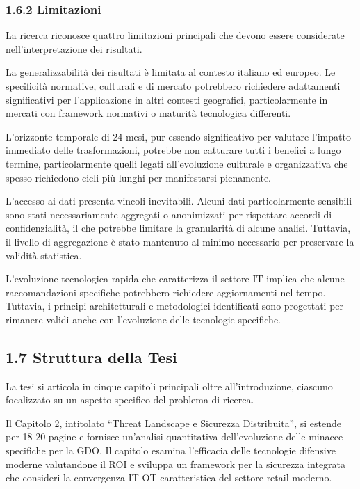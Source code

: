 \documentclass{report}
\begin{document}
\subsubsection{\texorpdfstring{\textbf{1.6.2
Limitazioni}}{1.6.2 Limitazioni}}\label{limitazioni}

La ricerca riconosce quattro limitazioni principali che devono essere
considerate nell'interpretazione dei risultati.

La generalizzabilità dei risultati è limitata al contesto italiano ed
europeo. Le specificità normative, culturali e di mercato potrebbero
richiedere adattamenti significativi per l'applicazione in altri
contesti geografici, particolarmente in mercati con framework normativi
o maturità tecnologica differenti.

L'orizzonte temporale di 24 mesi, pur essendo significativo per valutare
l'impatto immediato delle trasformazioni, potrebbe non catturare tutti i
benefici a lungo termine, particolarmente quelli legati all'evoluzione
culturale e organizzativa che spesso richiedono cicli più lunghi per
manifestarsi pienamente.

L'accesso ai dati presenta vincoli inevitabili. Alcuni dati
particolarmente sensibili sono stati necessariamente aggregati o
anonimizzati per rispettare accordi di confidenzialità, il che potrebbe
limitare la granularità di alcune analisi. Tuttavia, il livello di
aggregazione è stato mantenuto al minimo necessario per preservare la
validità statistica.

L'evoluzione tecnologica rapida che caratterizza il settore IT implica
che alcune raccomandazioni specifiche potrebbero richiedere
aggiornamenti nel tempo. Tuttavia, i principi architetturali e
metodologici identificati sono progettati per rimanere validi anche con
l'evoluzione delle tecnologie specifiche.

\subsection{\texorpdfstring{\textbf{1.7 Struttura della
Tesi}}{1.7 Struttura della Tesi}}\label{struttura-della-tesi}

La tesi si articola in cinque capitoli principali oltre
all'introduzione, ciascuno focalizzato su un aspetto specifico del
problema di ricerca.

Il Capitolo 2, intitolato ``Threat Landscape e Sicurezza Distribuita'',
si estende per 18-20 pagine e fornisce un'analisi quantitativa
dell'evoluzione delle minacce specifiche per la GDO. Il capitolo esamina
l'efficacia delle tecnologie difensive moderne valutandone il ROI e
sviluppa un framework per la sicurezza integrata che consideri la
convergenza IT-OT caratteristica del settore retail moderno.
\end{document}
